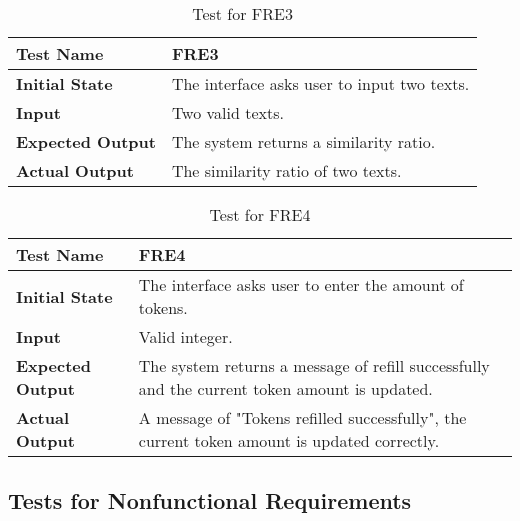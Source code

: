 \documentclass[12pt, titlepage]{article}
\begin{document}
		\begin{table}[H]
			
			\begin{tabular}[r]{|l|p{10cm}|}
				
				\hline
				
				\textbf{Test Name} & FRE3 \\ 
				\hline
				\textbf{Initial State} & The interface asks user to input two texts.\\ 
				\hline
				\textbf{Input} & Two valid texts. \\ 
				\hline 
				\textbf{Expected Output} & The system returns a similarity ratio.  \\ 
				\hline
				\textbf{Actual Output} & The similarity ratio of two texts.  \\ 
				\hline
				
			\end{tabular}
			\caption{Test for FRE3}
			\label{Table}
		\end{table}
		
		
		\begin{table}[H]
			
			\begin{tabular}[r]{|l|p{10cm}|}
				
				\hline
				
				\textbf{Test Name} & FRE4 \\ 
				\hline
				\textbf{Initial State} & The interface asks user to enter the amount of tokens.\\ 
				\hline
				\textbf{Input} & Valid integer. \\ 
				\hline 
				\textbf{Expected Output} & The system returns a message of refill successfully and the current token amount is updated.  \\ 
				\hline
				\textbf{Actual Output} &  A message of "Tokens refilled successfully", the current token amount is updated correctly. \\ 
				\hline
				
			\end{tabular}
			\caption{Test for FRE4}
			\label{Table}
		\end{table}
		
\subsection{Tests for Nonfunctional Requirements}		
\end{document}
